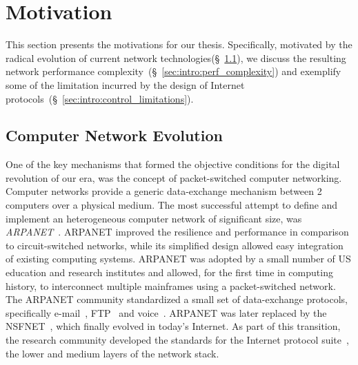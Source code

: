 \section{Motivation} \label{sec:intro:motivations}

This section presents the motivations for our thesis. Specifically, motivated by
the radical evolution of current network
technologies(\S~\ref{sec:intro:net_evolution}), we discuss the resulting network
performance complexity~(\S~\ref{sec:intro:perf_complexity}) and exemplify some
of the limitation incurred by the design of Internet
protocols~(\S~\ref{sec:intro:control_limitations}).

\subsection{Computer Network Evolution} \label{sec:intro:net_evolution}

One of the key mechanisms that formed the objective conditions for the digital
revolution of our era, was the concept of packet-switched computer networking.
Computer networks provide a generic data-exchange mechanism between 2 computers
over a physical medium.
The most successful attempt to define and implement an heterogeneous computer
network of significant size, was \textit{ARPANET}~\cite{beranek81}. ARPANET
improved the resilience and performance in comparison to circuit-switched
networks, while its simplified design allowed easy integration of existing
computing systems.  ARPANET was adopted by a small number of US education and
research institutes and allowed, for the first time in computing history, to
interconnect multiple mainframes using a packet-switched network. The ARPANET
community standardized a small set of data-exchange protocols, specifically
e-mail~\cite{RFC0561}, FTP~\cite{RFC0354} and voice~\cite{RFC0741}. ARPANET was
later replaced by the NSFNET~\cite{Mills:1987tt}, which finally evolved in
today's Internet.  As part of this transition, the research community developed
the standards for the Internet protocol suite~\cite{Clark:1988}, the lower and
medium layers of the network stack.


